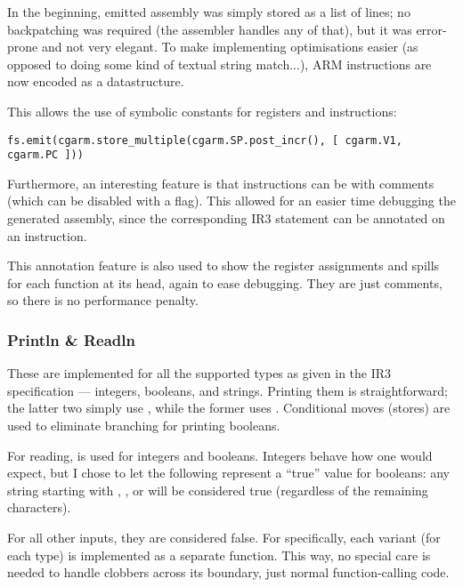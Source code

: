 \documentclass[12pt]{article}
\begin{document}
In the beginning, emitted assembly was simply stored as a list of lines; no backpatching was required (the assembler handles any
of that), but it was error-prone and not very elegant. To make implementing optimisations easier (as opposed to doing some
kind of textual string match...), ARM instructions are now encoded as a datastructure.

This allows the use of symbolic constants for registers and instructions:

\begin{verbatim}
fs.emit(cgarm.store_multiple(cgarm.SP.post_incr(), [ cgarm.V1, cgarm.PC ]))
\end{verbatim}

Furthermore, an interesting feature is that instructions can be  with comments (which can be disabled with a flag).
This allowed for an easier time debugging the generated assembly, since the corresponding IR3 statement can be annotated on an
instruction.

This annotation feature is also used to show the register assignments and spills for each function at its head, again to ease
debugging. They are just comments, so there is no performance penalty.



\subsubsection{Println \& Readln}

These are implemented for all the supported types as given in the IR3 specification --- integers, booleans, and strings. Printing
them is straightforward; the latter two simply use , while the former uses . Conditional moves (stores)
are used to eliminate branching for printing booleans.

For reading,  is used for integers and booleans. Integers behave how one would expect, but I chose to let the following
represent a \enquote{true} value for booleans: any string starting with , , or  will be considered true
(regardless of the remaining characters).

For all other inputs, they are considered false. For  specifically, each variant (for each type) is implemented as
a separate function. This way, no special care is needed to handle clobbers across its boundary, just normal function-calling code.

\end{document}
